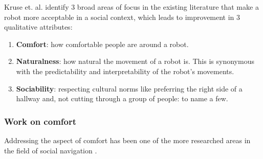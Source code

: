 
Kruse et. al. \cite{kruse_human-aware_2013} identify 3 broad areas of focus in the existing literature that make a robot more acceptable in a social context, which leads to improvement in $3$ qualitative attributes:

\begin{enumerate}
    \item \textbf{Comfort}: how comfortable people are around a robot. 
    \item \textbf{Naturalness}: how natural the movement of a robot is. This is synonymous with the predictability and interpretability of the robot's movements.
    \item \textbf{Sociability}: respecting cultural norms like preferring the right side of a hallway and, not cutting through a group of people: to name a few. %
\end{enumerate}

\subsubsection{Work on comfort}
Addressing the aspect of comfort has been one of the more researched areas in the field of social navigation \cite{kruse_human-aware_2013}.\\


